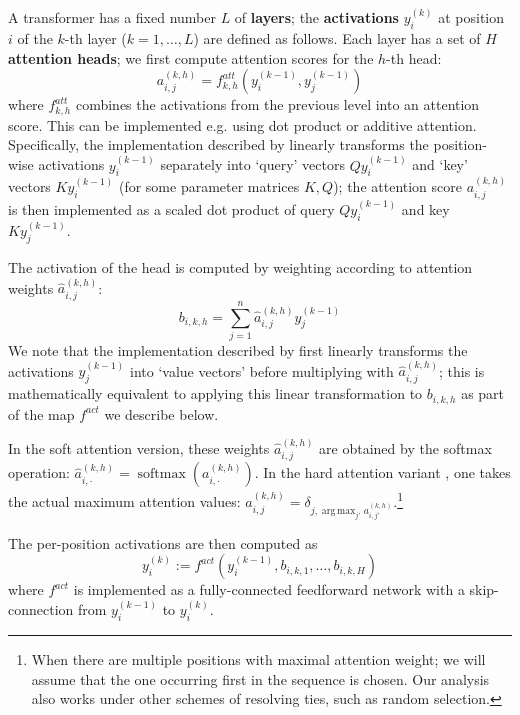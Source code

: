 \documentclass[11pt,a4paper]{article}
\DeclareMathOperator*{\argmax}{arg\,max}
\newcommand{\key}[1]{\textbf{#1}}
\begin{document}
A transformer has a fixed number $L$ of \key{layers}; the \key{activations} $y_i^{(k)}$ at position $i$ of the $k$-th layer ($k=1, \dots, L$) are defined as follows.
Each layer has a set of $H$ \key{attention heads}; we first compute attention scores for the $h$-th head:
\begin{equation}
    a_{i,j}^{(k,h)} = f^{att}_{k,h}\left(y_i^{(k-1)}, y_j^{(k-1)}\right)
\end{equation}
where $f^{att}_{k,h}$ combines the activations from the previous level into an attention score.
This can be implemented e.g. using dot product or additive attention.
Specifically, the implementation described by \citet[p. 5]{vaswani2017attention} linearly transforms the position-wise activations $y_i^{(k-1)}$ separately into `query' vectors $Q y_i^{(k-1)}$ and `key' vectors $K y_i^{(k-1)}$ (for some parameter matrices $K, Q$); %
the attention score $a_{i,j}^{(k,h)}$ is then implemented as a scaled dot product of query $Q y_i^{(k-1)}$ and key $K y_j^{(k-1)}$.


The  activation of the head is computed by weighting according to attention weights $\hat{a}_{i,j}^{(k,h)}$:
\begin{equation}
    b_{i,k,h} = \sum_{j=1}^n \hat{a}_{i,j}^{(k,h)} y_j^{(k-1)} %
\end{equation}
We note that the implementation described by \citet{vaswani2017attention} first linearly transforms the activations $y_j^{(k-1)}$ into `value vectors' before multiplying with $ \hat{a}_{i,j}^{(k,h)}$; this is mathematically equivalent to applying this linear transformation to $b_{i,k,h}$ as part of the map $f^{act}$ we describe below.

In the soft attention version, these weights $\hat{a}_{i,j}^{(k,h)}$ are obtained by the softmax operation: $\hat{a}_{i,\cdot}^{(k,h)} = \operatorname{softmax}(a_{i,\cdot}^{(k,h)})$.
In the hard attention variant \cite{perez2019turing}, one takes the actual maximum attention values:
$\hat{a}_{i,j}^{(k,h)} = \delta_{j, \argmax_{j'} a_{i,j'}^{(k,h)}}$.\footnote{When there are multiple positions with maximal attention weight; we will assume that the one occurring first in the sequence is chosen. Our analysis also works under other schemes of resolving ties, such as random selection.}

The  per-position activations are then computed as
\begin{equation}
    y_i^{(k)} := f^{act}(y_i^{(k-1)}, b_{i,k,1}, \dots, b_{i,k,H})
\end{equation}
where $f^{act}$ is implemented as a fully-connected feedforward network with a skip-connection \cite{vaswani2017attention} from $y_i^{(k-1)}$ to $y_i^{(k)}$.
\end{document}
